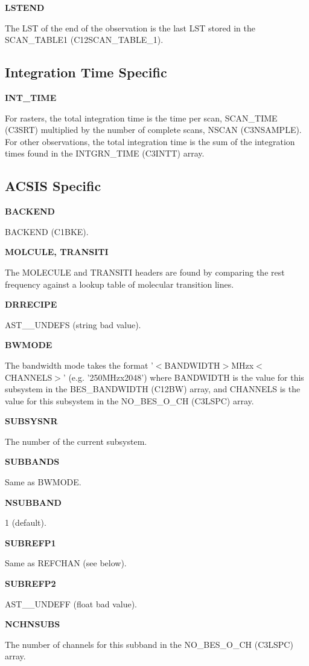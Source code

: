 \documentclass[twoside,11pt,nolof]{starlink}
\providecommand{\backend}{BACKEND (C1BKE)}
\providecommand{\nScan}{NSCAN (C3NSAMPLE)}
\providecommand{\scanTime}{SCAN\_TIME (C3SRT)}
\providecommand{\scanTableA}{SCAN\_TABLE1 (C12SCAN\_TABLE\_1)}
\providecommand{\BEChans}{NO\_BES\_O\_CH (C3LSPC)}
\providecommand{\bandwidths}{BES\_BANDWIDTH (C12BW)}
\providecommand{\intTimes}{INTGRN\_TIME (C3INTT)}
\begin{document}
\textbf{LSTEND}

The LST of the end of the observation is the last LST stored in the \scanTableA.

\subsection{Integration Time Specific}

\textbf{INT\_TIME}

For rasters, the total integration time is the time per scan, \scanTime{} multiplied by the number of complete scans, \nScan.  For other observations, the total integration time is the sum of the integration times found in the \intTimes{} array.

\subsection{ACSIS Specific}

\textbf{BACKEND}

\backend.

\textbf{MOLCULE, TRANSITI}

The MOLECULE and TRANSITI headers are found by comparing the rest frequency against a lookup table of molecular transition lines.

\textbf{DRRECIPE}

AST\_\_UNDEFS (string bad value).

\textbf{BWMODE}

The bandwidth mode takes the format '$<$BANDWIDTH$>$MHzx$<$CHANNELS$>$' (e.g. '250MHzx2048') where BANDWIDTH is the value for this subsystem in the \bandwidths{} array, and CHANNELS is the value for this subsystem in the \BEChans{} array.

\textbf{SUBSYSNR}

The number of the current subsystem.

\textbf{SUBBANDS}

Same as BWMODE.

\textbf{NSUBBAND}

1 (default).

\textbf{SUBREFP1}

Same as REFCHAN (see below).

\textbf{SUBREFP2}

AST\_\_UNDEFF (float bad value).

\textbf{NCHNSUBS}

The number of channels for this subband in the \BEChans{} array.
\end{document}
